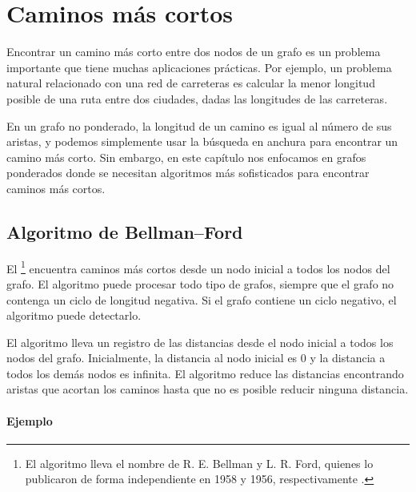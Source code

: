 \chapter{Caminos más cortos}


Encontrar un camino más corto entre dos nodos
de un grafo
es un problema importante que tiene muchas
aplicaciones prácticas.
Por ejemplo, un problema natural relacionado con una red de carreteras
es calcular la menor longitud posible de una ruta
entre dos ciudades, dadas las longitudes de las carreteras.

En un grafo no ponderado, la longitud de un camino es igual
al número de sus aristas, y podemos
simplemente usar la búsqueda en anchura para encontrar
un camino más corto.
Sin embargo, en este capítulo nos enfocamos en
grafos ponderados
donde se necesitan algoritmos más sofisticados
para encontrar caminos más cortos.

\section{Algoritmo de Bellman–Ford}


El \footnote{El algoritmo lleva el nombre de
R. E. Bellman y L. R. Ford, quienes lo publicaron de forma independiente
en 1958 y 1956, respectivamente \cite{bel58,for56a}.} encuentra
caminos más cortos desde un nodo inicial a todos
los nodos del grafo.
El algoritmo puede procesar todo tipo de grafos,
siempre que el grafo no contenga un
ciclo de longitud negativa.
Si el grafo contiene un ciclo negativo,
el algoritmo puede detectarlo.

El algoritmo lleva un registro de las distancias
desde el nodo inicial a todos los nodos del grafo.
Inicialmente, la distancia al nodo inicial es 0
y la distancia a todos los demás nodos es infinita.
El algoritmo reduce las distancias encontrando
aristas que acortan los caminos hasta que no es
posible reducir ninguna distancia.

\subsubsection{Ejemplo}

